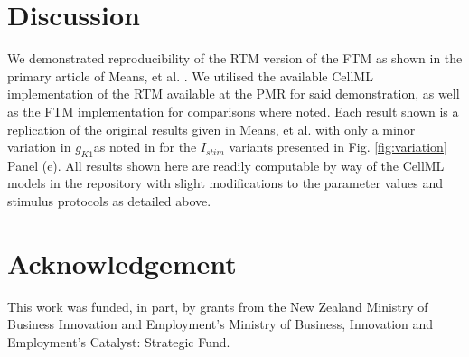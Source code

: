 \documentclass[fleqn,10pt]{physiome}
\begin{document}
\section{Discussion}

We demonstrated reproducibility of the RTM version of the FTM as shown in the primary article of Means, et al. \citep{means2022}. We utilised the available CellML implementation of the RTM available at the PMR for said demonstration, as well as the FTM implementation for comparisons where noted. Each result shown is a replication of the original results given in Means, et al. with only a minor variation in $g_{K1}$as noted in for the $I_{stim}$ variants presented in Fig. \ref{fig:variation} Panel (e). All results shown here are readily computable by way of the CellML models in the repository with slight modifications to the parameter values and stimulus protocols as detailed above. 

\section{Acknowledgement}
 
This work was funded, in part, by grants from the New Zealand Ministry of Business Innovation and Employment's Ministry of Business, Innovation and Employment's Catalyst: Strategic Fund.

%
%
%
%
%
%
\end{document}
